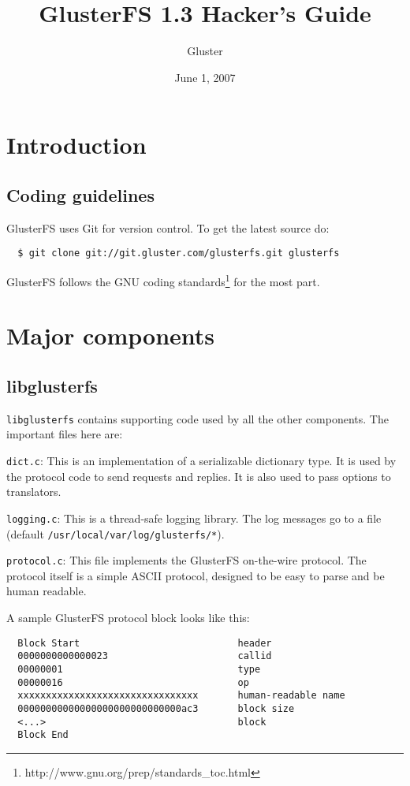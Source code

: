 \documentclass{book}[12pt]
\begin{document}

\author{Gluster}
\title{GlusterFS 1.3 Hacker's Guide}
\date{June 1, 2007}

\maketitle
\frontmatter
\tableofcontents

\mainmatter
\chapter{Introduction}

\section{Coding guidelines}
GlusterFS uses Git for version control. To get the latest source do:
\begin{verbatim}
  $ git clone git://git.gluster.com/glusterfs.git glusterfs
\end{verbatim}
\noindent
GlusterFS follows the GNU coding
standards\footnote{http://www.gnu.org/prep/standards\_toc.html} for the
most part.

\chapter{Major components}
\section{libglusterfs}
\texttt{libglusterfs} contains supporting code used by all the other components.
The important files here are:

\texttt{dict.c}: This is an implementation of a serializable dictionary type. It is
used by the protocol code to send requests and replies. It is also used to pass options
to translators.

\texttt{logging.c}: This is a thread-safe logging library. The log messages go to a
file (default \texttt{/usr/local/var/log/glusterfs/*}).

\texttt{protocol.c}: This file implements the GlusterFS on-the-wire
protocol. The protocol itself is a simple ASCII protocol, designed to
be easy to parse and be human readable.

A sample GlusterFS protocol block looks like this:
\begin{verbatim}
  Block Start                            header
  0000000000000023                       callid
  00000001                               type
  00000016                               op
  xxxxxxxxxxxxxxxxxxxxxxxxxxxxxxxx       human-readable name
  00000000000000000000000000000ac3       block size
  <...>                                  block
  Block End
\end{verbatim}
\end{document}

